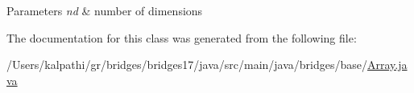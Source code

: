 \begin{DoxyParams}{Parameters}
{\em nd} & number of dimensions \\
\hline
\end{DoxyParams}


The documentation for this class was generated from the following file\+:\begin{DoxyCompactItemize}
\item 
/\+Users/kalpathi/gr/bridges/bridges17/java/src/main/java/bridges/base/\hyperlink{_array_8java}{Array.\+java}\end{DoxyCompactItemize}

